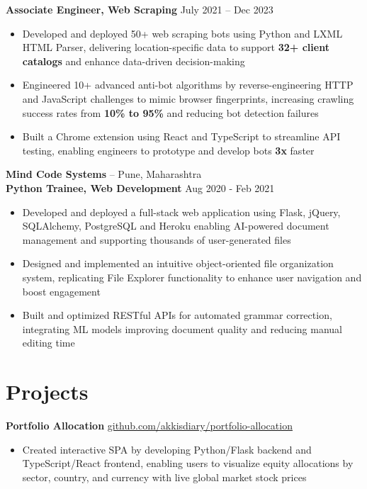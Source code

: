\documentclass[11pt]{article}       %
\begin{document}
\vspace{-5pt}
\textbf{Associate Engineer, Web Scraping} \hfill July 2021 -- Dec 2023 \\
\vspace{-9pt}
\begin{itemize}
  \item Developed and deployed 50+ web scraping bots using Python and LXML HTML Parser, delivering location-specific data to support \textbf{32+ client catalogs} and enhance data-driven decision-making \\ 
  \item Engineered 10+ advanced anti-bot algorithms by reverse-engineering HTTP and JavaScript challenges to mimic browser fingerprints, increasing crawling success rates from \textbf{10\% to 95\%} and reducing bot detection failures \\
  \item Built a Chrome extension using React and TypeScript to streamline API testing, enabling engineers to prototype and develop bots \textbf{3x} faster \\
\end{itemize}

\textbf {Mind Code Systems} -- Pune, Maharashtra \\
\textbf{Python Trainee, Web Development} \hfill Aug 2020 - Feb 2021 \\
\vspace{-9pt}
\begin{itemize}
  \item Developed and deployed a full-stack web application using Flask, jQuery, SQLAlchemy, PostgreSQL and Heroku enabling AI-powered document management and supporting thousands of user-generated files \\
  \item Designed and implemented an intuitive object-oriented file organization system, replicating File Explorer functionality to enhance user navigation and boost engagement \\
  \item Built and optimized RESTful APIs for automated grammar correction, integrating ML models improving document quality and reducing manual editing time \\
\end{itemize}

\vspace{-18.5pt}

\section*{Projects}
\textbf{Portfolio Allocation} \hfill \href{https://github.com/Akkisdiary/portfolio-allocation}{github.com/akkisdiary/portfolio-allocation} \\
\vspace{-9pt}
\begin{itemize}
  \item Created interactive SPA by developing Python/Flask backend and TypeScript/React frontend, enabling users to visualize equity allocations by sector, country, and currency with live global market stock prices \\
\end{itemize}
\end{document}
